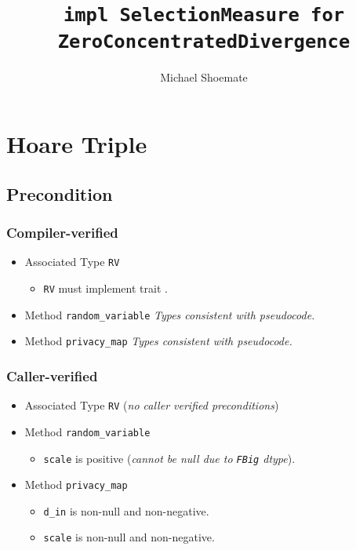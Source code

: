 \documentclass{article}
\title{\texttt{impl SelectionMeasure for ZeroConcentratedDivergence}}
\author{Michael Shoemate}
\begin{document}
  
\maketitle 
 
\section{Hoare Triple} 
\subsection*{Precondition} 
\subsubsection*{Compiler-verified}
\begin{itemize}
    \item Associated Type \texttt{RV}
        \begin{itemize}
            \item \texttt{RV} must implement trait .
        \end{itemize}
    \item Method \texttt{random\_variable}
        \textit{Types consistent with pseudocode.}
    \item Method \texttt{privacy\_map}
        \textit{Types consistent with pseudocode.}
\end{itemize}

\subsubsection*{Caller-verified}
\begin{itemize}
    \item Associated Type \texttt{RV} (\textit{no caller verified preconditions})
    \item Method \texttt{random\_variable}
        \begin{itemize}
            \item \texttt{scale} is positive (\textit{cannot be null due to \texttt{FBig} dtype}).
        \end{itemize}
    \item Method \texttt{privacy\_map}
        \begin{itemize}
            \item \texttt{d\_in} is non-null and non-negative.
            \item \texttt{scale} is non-null and non-negative.
        \end{itemize}
\end{itemize}
\end{document}
